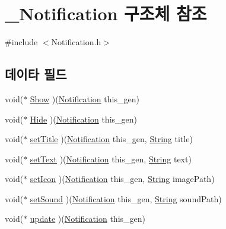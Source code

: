 \hypertarget{struct___notification}{\section{\-\_\-\-Notification 구조체 참조}
\label{struct___notification}
}


{\ttfamily \#include $<$Notification.\-h$>$}

\subsection*{데이타 필드}
\begin{DoxyCompactItemize}
\item 
void($\ast$ \hyperlink{struct___notification_ab9b2b384b324352b76dbd9630f56fbbd}{Show} )(\hyperlink{_notification_8h_a89fa64926bb603299f73fe94ebd3a966}{Notification} this\-\_\-gen)
\item 
void($\ast$ \hyperlink{struct___notification_afebf9eb8c3faebc7a4c31e0a4a304889}{Hide} )(\hyperlink{_notification_8h_a89fa64926bb603299f73fe94ebd3a966}{Notification} this\-\_\-gen)
\item 
void($\ast$ \hyperlink{struct___notification_a73a3d4126ff83547c55a74c8d31223bf}{set\-Title} )(\hyperlink{_notification_8h_a89fa64926bb603299f73fe94ebd3a966}{Notification} this\-\_\-gen, \hyperlink{dit_8h_a2efe6d463d80744789f228f5dc4baa39}{String} title)
\item 
void($\ast$ \hyperlink{struct___notification_a8c4bcdca602f3eb58482c39ecd39f1e8}{set\-Text} )(\hyperlink{_notification_8h_a89fa64926bb603299f73fe94ebd3a966}{Notification} this\-\_\-gen, \hyperlink{dit_8h_a2efe6d463d80744789f228f5dc4baa39}{String} text)
\item 
void($\ast$ \hyperlink{struct___notification_a73b07a7d9dc89b95a4941d754f729deb}{set\-Icon} )(\hyperlink{_notification_8h_a89fa64926bb603299f73fe94ebd3a966}{Notification} this\-\_\-gen, \hyperlink{dit_8h_a2efe6d463d80744789f228f5dc4baa39}{String} image\-Path)
\item 
void($\ast$ \hyperlink{struct___notification_a51f29ca15c81900eb431f952bc7a864c}{set\-Sound} )(\hyperlink{_notification_8h_a89fa64926bb603299f73fe94ebd3a966}{Notification} this\-\_\-gen, \hyperlink{dit_8h_a2efe6d463d80744789f228f5dc4baa39}{String} sound\-Path)
\item 
void($\ast$ \hyperlink{struct___notification_a0b608c07f45459f63d0bed2f4f6c5962}{update} )(\hyperlink{_notification_8h_a89fa64926bb603299f73fe94ebd3a966}{Notification} this\-\_\-gen)
\end{DoxyCompactItemize}


